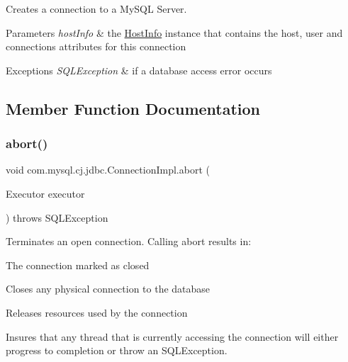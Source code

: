 Creates a connection to a My\+S\+QL Server.


\begin{DoxyParams}{Parameters}
{\em host\+Info} & the \mbox{\hyperlink{}{Host\+Info}} instance that contains the host, user and connections attributes for this connection \\
\hline
\end{DoxyParams}

\begin{DoxyExceptions}{Exceptions}
{\em S\+Q\+L\+Exception} & if a database access error occurs \\
\hline
\end{DoxyExceptions}


\subsection{Member Function Documentation}
\mbox{\label{classcom_1_1mysql_1_1cj_1_1jdbc_1_1_connection_impl_a97fc7b6202c905eca353b5d307a9a04d}} 
\subsubsection{\texorpdfstring{abort()}{abort()}}
{\footnotesize\ttfamily void com.\+mysql.\+cj.\+jdbc.\+Connection\+Impl.\+abort (\begin{DoxyParamCaption}\item[{Executor}]{executor }\end{DoxyParamCaption}) throws S\+Q\+L\+Exception}

Terminates an open connection. Calling {\ttfamily abort} results in\+: 
\begin{DoxyItemize}
\item The connection marked as closed 
\item Closes any physical connection to the database 
\item Releases resources used by the connection 
\item Insures that any thread that is currently accessing the connection will either progress to completion or throw an {\ttfamily S\+Q\+L\+Exception}. 
\end{DoxyItemize}

